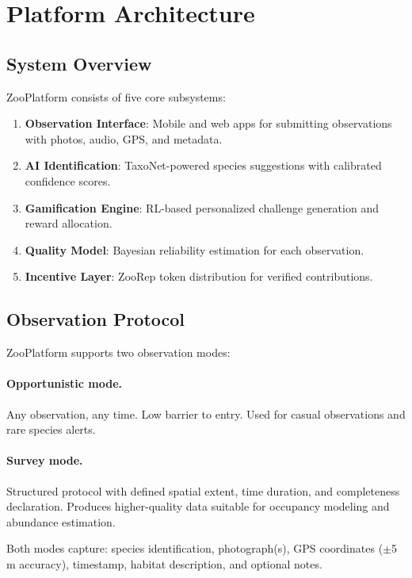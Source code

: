 \section{Platform Architecture}

\label{sec:architecture}

\subsection{System Overview}

ZooPlatform consists of five core subsystems:

\begin{enumerate}
  \item \textbf{Observation Interface}: Mobile and web apps for
    submitting observations with photos, audio, GPS, and metadata.
  \item \textbf{AI Identification}: TaxoNet-powered species suggestions
    with calibrated confidence scores.
  \item \textbf{Gamification Engine}: RL-based personalized challenge
    generation and reward allocation.
  \item \textbf{Quality Model}: Bayesian reliability estimation for
    each observation.
  \item \textbf{Incentive Layer}: ZooRep token distribution for
    verified contributions.
\end{enumerate}

\subsection{Observation Protocol}

ZooPlatform supports two observation modes:

\paragraph{Opportunistic mode.} Any observation, any time. Low barrier
to entry. Used for casual observations and rare species alerts.

\paragraph{Survey mode.} Structured protocol with defined spatial extent,
time duration, and completeness declaration. Produces higher-quality data
suitable for occupancy modeling and abundance estimation.

Both modes capture: species identification, photograph(s), GPS
coordinates ($\pm$5\,m accuracy), timestamp, habitat description, and
optional notes.


